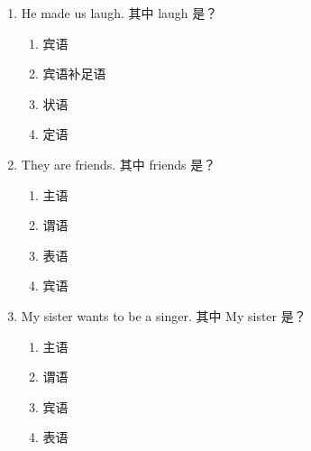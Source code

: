 \documentclass[11pt,a4paper]{ctexart}
\begin{document}
\begin{enumerate}[leftmargin=*,itemsep=4pt]
\begin{enumerate}[label=\Alph*.,leftmargin=2em,itemsep=1pt,topsep=2pt]
\item 定语
\end{enumerate}
\item He made us laugh. 其中 laugh 是？
\begin{enumerate}[label=\Alph*.,leftmargin=2em,itemsep=1pt,topsep=2pt]
\item 宾语
\item 宾语补足语
\item 状语
\item 定语
\end{enumerate}
\item They are friends. 其中 friends 是？
\begin{enumerate}[label=\Alph*.,leftmargin=2em,itemsep=1pt,topsep=2pt]
\item 主语
\item 谓语
\item 表语
\item 宾语
\end{enumerate}
\item My sister wants to be a singer. 其中 My sister 是？
\begin{enumerate}[label=\Alph*.,leftmargin=2em,itemsep=1pt,topsep=2pt]
\item 主语
\item 谓语
\item 宾语
\item 表语
\end{enumerate}
\end{enumerate}

\newpage
\end{document}
